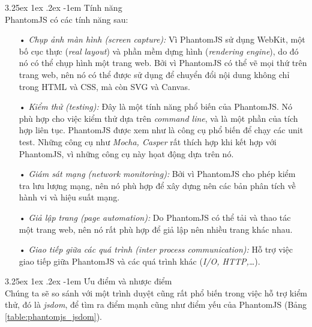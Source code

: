 \documentclass[12pt,a4paper,twoside]{article}
\makeatletter
\newcommand{\myparagraph}[1]{\paragraph{#1}\mbox{}\\} %
\renewcommand\paragraph{\@startsection{paragraph}{5}{\z@}%
  {3.25ex \@plus1ex \@minus.2ex}%
  {-1em}%
  {\normalfont\normalsize\bfseries}}
\makeatother
\begin{document}
\myparagraph{Tính năng}
PhantomJS có các tính năng sau:
\begin{itemize}
\item[•] \emph{Chụp ảnh màn hình (screen capture):} Vì PhantomJS sử dụng WebKit, một bố cục thực (\textit{real layout}) và phần mềm dựng hình (\textit{rendering engine}), do đó nó có thể chụp hình một trang web. Bởi vì PhantomJS có thể vẽ mọi thứ trên trang web, nên nó có thể được sử dụng để chuyển đổi nội dung không chỉ trong HTML và CSS, mà còn SVG và Canvas.
\item[•] \emph{Kiểm thử (testing):} Đây là một tính năng phổ biến của PhantomJS. Nó phù hợp cho việc kiểm thử dựa trên \textit{command line}, và là một phần của tích hợp liên tục. PhantomJS được xem như là công cụ phổ biến để chạy các unit test. Những công cụ như \textit{Mocha, Casper} rất thích hợp khi kết hợp với PhantomJS, vì những công cụ này họat động dựa trên nó.
\item[•] \emph{Giám sát mạng (network monitoring):} Bởi vì PhantomJS cho phép kiểm tra lưu lượng mạng, nên nó phù hợp để xây dựng nên các bản phân tích về hành vi và hiệu suất mạng.
\item[•] \emph{Giả lập trang (page automation):} Do PhantomJS có thể tải và thao tác một trang web, nên nó rất phù hợp để giả lập nên nhiều trang khác nhau.
\item[•] \emph{Giao tiếp giữa các quá trình (inter process communication):} Hỗ trợ việc giao tiếp giữa PhantomJS và các quá trình khác (\textit{I/O, HTTP,…}).
\end{itemize}

\myparagraph{Ưu điểm và nhược điểm}
Chúng ta sẽ so sánh\cite{jsdom_phantomjs} với một trình duyệt cũng rất phổ biến trong việc hỗ trợ kiểm thử, đó là \textit{jsdom}, để tìm ra điểm mạnh cũng như điểm yếu của PhantomJS (Bảng \ref{table:phantomjs_jsdom}).
\end{document}
